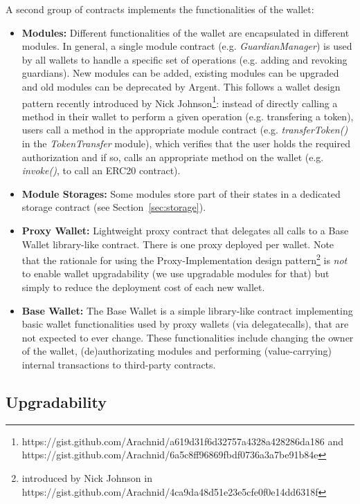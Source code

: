 \documentclass[12pt]{article}
\begin{document}
A second group of contracts implements the functionalities of the wallet:
\begin{itemize}
    \item \textbf{Modules:} Different functionalities of the wallet are encapsulated in different modules. In general, a single module contract (e.g. \emph{GuardianManager}) is used by all wallets to handle a specific set of operations (e.g. adding and revoking guardians). New modules can be added, existing modules can be upgraded and old modules can be deprecated by Argent. This follows a wallet design pattern recently introduced by Nick Johnson\footnote{https://gist.github.com/Arachnid/a619d31f6d32757a4328a428286da186 and https://gist.github.com/Arachnid/6a5c8ff96869fbdf0736a3a7be91b84e}: instead of directly calling a method in their wallet to perform a given operation (e.g. transfering a token), users call a method in the appropriate module contract (e.g. \emph{transferToken()} in the \emph{TokenTransfer} module), which  verifies that the user holds the required authorization and if so, calls an appropriate method on the wallet (e.g. \emph{invoke()}, to call an ERC20 contract).
    \item \textbf{Module Storages:} Some modules store part of their states in a dedicated storage contract (see Section~\ref{sec:storage}).
    \item \textbf{Proxy Wallet:} Lightweight proxy contract that delegates all calls to a Base Wallet library-like contract. There is one proxy deployed per wallet. Note that the rationale for using the Proxy-Implementation design pattern\footnote{ introduced by Nick Johnson in https://gist.github.com/Arachnid/4ca9da48d51e23e5cfe0f0e14dd6318f} is \emph{not} to enable wallet upgradability (we use upgradable modules for that) but simply to reduce the deployment cost of each new wallet.
    \item \textbf{Base Wallet:} The Base Wallet is a simple library-like contract implementing basic wallet functionalities used by proxy wallets (via delegatecalls), that are not expected to ever change. These functionalities include changing the owner of the wallet, (de)authorizating modules and performing (value-carrying) internal transactions to third-party contracts.
\end{itemize}

\subsection{Upgradability}
\label{sec:upgradability}
\end{document}
